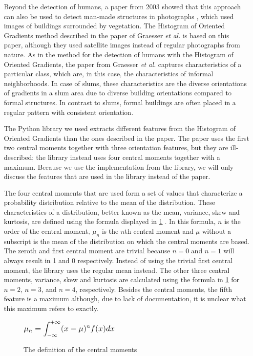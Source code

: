 Beyond the detection of humans, a paper from 2003 showed that this approach can also be used to detect man-made structures in photographs \cite{kumar2003man}, which used images of buildings surrounded by vegetation. The Histogram of Oriented Gradients method described in the paper of Graesser \textit{et al.} is based on this paper, although they used satellite images instead of regular photographs from nature. As in the method for the detection of humans with the Histogram of Oriented Gradients, the paper from Graesser \textit{et al.} captures characteristics of a particular class, which are, in this case, the characteristics of informal neighborhoods. In case of slums, these characteristics are the diverse orientations of gradients in a slum area due to diverse building orientations compared to formal structures. In contrast to slums, formal buildings are often placed in a regular pattern with consistent orientation.


The Python library we used extracts different features from the Histogram of Oriented Gradients than the ones described in the paper. The paper uses the first two central moments together with three orientation features, but they are ill-described; the library instead uses four central moments together with a maximum. Because we use the implementation from the library, we will only discuss the features that are used in the library instead of the paper. 

The four central moments that are used form a set of values that characterize a probability distribution relative to the mean of the distribution. These characteristics of a distribution, better known as the mean, variance, skew and kurtosis, are defined using the formula displayed in \ref{central_moments} \cite{grimmett2001probability}. In this formula, $n$ is the order of the central moment, $\mu_{n}$ is the $n$th central moment and $\mu$ without a subscript is the mean of the distribution on which the central moments are based. The zeroth and first central moment are trivial because $n=0$ and $n=1$ will always result in 1 and 0 respectively. Instead of using the trivial first central moment, the library uses the regular mean instead. The other three central moments, variance, skew and kurtosis are calculated using the formula in \ref{central_moments} for $n=2$, $n=3$, and $n=4$, respectively. Besides the central moments, the fifth feature is a maximum although, due to lack of documentation, it is unclear what this maximum refers to exactly.

\begin{figure}[h]
    \centering
    $\mathlarger{\mathlarger{\mu_{n} = \int_{-\infty}^{+\infty} (x-\mu)^nf(x)dx }} $
    \caption{The definition of the central moments}
    \label{central_moments}
\end{figure}

